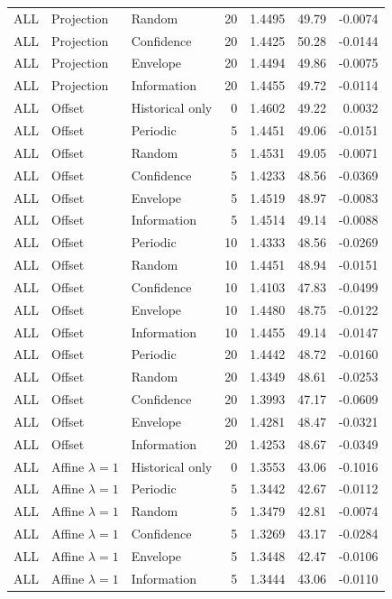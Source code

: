 \begin{longtable}{lllrrrr}
ALL & Projection & Random & 20 & 1.4495 & 49.79 & -0.0074 \\
ALL & Projection & Confidence & 20 & 1.4425 & 50.28 & -0.0144 \\
ALL & Projection & Envelope & 20 & 1.4494 & 49.86 & -0.0075 \\
ALL & Projection & Information & 20 & 1.4455 & 49.72 & -0.0114 \\
ALL & Offset & Historical only & 0 & 1.4602 & 49.22 & 0.0032 \\
ALL & Offset & Periodic & 5 & 1.4451 & 49.06 & -0.0151 \\
ALL & Offset & Random & 5 & 1.4531 & 49.05 & -0.0071 \\
ALL & Offset & Confidence & 5 & 1.4233 & 48.56 & -0.0369 \\
ALL & Offset & Envelope & 5 & 1.4519 & 48.97 & -0.0083 \\
ALL & Offset & Information & 5 & 1.4514 & 49.14 & -0.0088 \\
ALL & Offset & Periodic & 10 & 1.4333 & 48.56 & -0.0269 \\
ALL & Offset & Random & 10 & 1.4451 & 48.94 & -0.0151 \\
ALL & Offset & Confidence & 10 & 1.4103 & 47.83 & -0.0499 \\
ALL & Offset & Envelope & 10 & 1.4480 & 48.75 & -0.0122 \\
ALL & Offset & Information & 10 & 1.4455 & 49.14 & -0.0147 \\
ALL & Offset & Periodic & 20 & 1.4442 & 48.72 & -0.0160 \\
ALL & Offset & Random & 20 & 1.4349 & 48.61 & -0.0253 \\
ALL & Offset & Confidence & 20 & 1.3993 & 47.17 & -0.0609 \\
ALL & Offset & Envelope & 20 & 1.4281 & 48.47 & -0.0321 \\
ALL & Offset & Information & 20 & 1.4253 & 48.67 & -0.0349 \\
ALL & Affine $\lambda=1$ & Historical only & 0 & 1.3553 & 43.06 & -0.1016 \\
ALL & Affine $\lambda=1$ & Periodic & 5 & 1.3442 & 42.67 & -0.0112 \\
ALL & Affine $\lambda=1$ & Random & 5 & 1.3479 & 42.81 & -0.0074 \\
ALL & Affine $\lambda=1$ & Confidence & 5 & 1.3269 & 43.17 & -0.0284 \\
ALL & Affine $\lambda=1$ & Envelope & 5 & 1.3448 & 42.47 & -0.0106 \\
ALL & Affine $\lambda=1$ & Information & 5 & 1.3444 & 43.06 & -0.0110 \\

\end{longtable}

